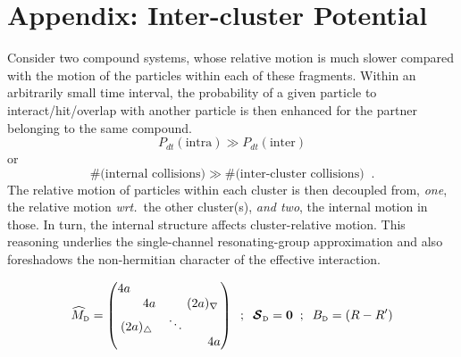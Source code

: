 \documentclass[onecolumn,preprint,superscriptaddress,nofootinbib,notitlepage,10pt,linenumbers]{revtex4-1}
\def\cM{{\widehat{M}}}
\newcommand{\subd}{_\text{\tiny D}}
\def\cS{{\mathcal S}}
\newcommand{\wrt}{\textit{wrt.}\;}
\newcommand{\ve}[1]{\ensuremath{\boldsymbol{#1}}}
\begin{document}
\newpage
\section{Appendix: Inter-cluster Potential}
Consider two compound systems, whose relative motion is much slower compared with the
motion of the particles within each of these fragments. Within an arbitrarily small
time interval, the probability of a given particle to interact/hit/overlap with another
particle is then enhanced for the partner belonging to the same compound.
\[P_{dt}(\text{intra})\gg P_{dt}(\text{inter})\]
or
\[\text{\#(internal collisions)}\gg\text{\#(inter-cluster collisions)}\;\;.\]
The relative motion of particles within each cluster is then decoupled from, {\it one}, the
relative motion \wrt~the other cluster(s), {\it and two}, the internal motion
in those. In turn, the internal structure affects cluster-relative motion.
This reasoning underlies the single-channel resonating-group approximation and
also foreshadows the non-hermitian character of the effective interaction.

\begin{gather}
\cM\subd=\begin{pmatrix}4a & & & \\ & 4a & &\multicolumn{2}{l}{\!\!\!\!(2a)_\nabla}\\
 \multicolumn{2}{c}{(2a)_\triangle} & \ddots & \\ & & & & 4a \\\end{pmatrix}
\;\;;\;\;\ve{\cS}\subd =\ve{0}\;\;;\;\;B\subd =(R-R')
\end{gather}
\end{document}
